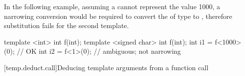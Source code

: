 \pnum
\begin{example}
In the following example,
assuming a 
cannot represent the value 1000,
a narrowing conversion
would be required
to convert the 
of type  to ,
therefore substitution fails for the
second template.

\begin{codeblock}
template <int> int f(int);
template <signed char> int f(int);
int i1 = f<1000>(0);            // OK
int i2 = f<1>(0);               // ambiguous; not narrowing
\end{codeblock}
\end{example}

[temp.deduct.call]{Deducing template arguments from a function call}

